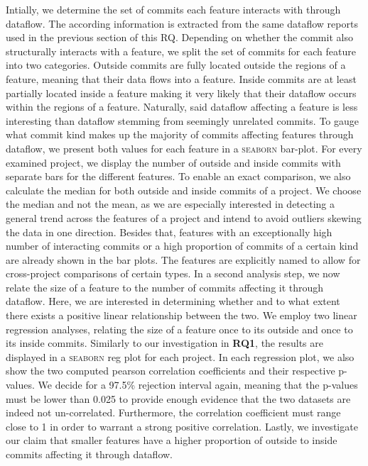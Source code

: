 Intially, we determine the set of commits each feature interacts with through dataflow.
The according information is extracted from the same dataflow reports used in the previous section of this RQ.
Depending on whether the commit also structurally interacts with a feature, we split the set of commits for each feature into two categories.
Outside commits are fully located outside the regions of a feature, meaning that their data flows into a feature.
Inside commits are at least partially located inside a feature making it very likely that their dataflow occurs within the regions of a feature.
Naturally, said dataflow affecting a feature is less interesting than dataflow stemming from seemingly unrelated commits.
To gauge what commit kind makes up the majority of commits affecting features through dataflow, we present both values for each feature in a \textsc{seaborn} bar-plot.
For every examined project, we display the number of outside and inside commits with separate bars for the different features.
To enable an exact comparison, we also calculate the median for both outside and inside commits of a project.
We choose the median and not the mean, as we are especially interested in detecting a general trend across the features of a project and intend to avoid outliers skewing the data in one direction.
Besides that, features with an exceptionally high number of interacting commits or a high proportion of commits of a certain kind are already shown in the bar plots.
The features are explicitly named to allow for cross-project comparisons of certain types.
In a second analysis step, we now relate the size of a feature to the number of commits affecting it through dataflow.
Here, we are interested in determining whether and to what extent there exists a positive linear relationship between the two.
We employ two linear regression analyses, relating the size of a feature once to its outside and once to its inside commits.
Similarly to our investigation in \textbf{RQ1}, the results are displayed in a \textsc{seaborn} reg plot for each project.
In each regression plot, we also show the two computed pearson correlation coefficients and their respective p-values.
We decide for a 97.5\% rejection interval again, meaning that the p-values must be lower than 0.025 to provide enough evidence that the two datasets are indeed not un-correlated.
Furthermore, the correlation coefficient must range close to 1 in order to warrant a strong positive correlation.
Lastly, we investigate our claim that smaller features have a higher proportion of outside to inside commits affecting it through dataflow.
